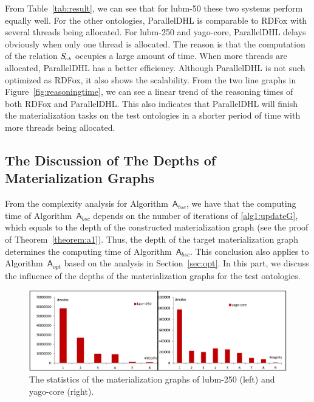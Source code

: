 From Table~\ref{tab:result}, we can see that for lubm-50 these two systems perform equally well.
For the other ontologies, ParallelDHL is comparable to RDFox with several threads being allocated.
For lubm-250 and yago-core, ParallelDHL delays obviously when only one thread is allocated.
The reason is that the computation of the relation $S_{\textit{\!\tiny rch}}$ occupies a large amount of time. When
more threads are allocated, ParallelDHL has a better efficiency.
Although ParallelDHL is not such optimized as RDFox, it also shows the scalability.
From the two line graphs in Figure~\ref{fig:reasoningtime},
we can see a linear trend of the reasoning times of both RDFox and ParallelDHL.
This also indicates that ParallelDHL will finish the materialization tasks on the test ontologies
in a shorter period of time with more threads being allocated.

\subsection{The Discussion of The Depths of Materialization Graphs}

From the complexity analysis for Algorithm~$\mathsf{A}_{bsc}$, we have that the computing time of
Algorithm~$\mathsf{A}_{bsc}$ depends on the number of iterations of \ref{alg1:updateG},
which equals to the depth of the constructed materialization graph (see the proof of Theorem~\ref{theorem:a1}).
Thus, the depth of the target materialization graph determines the computing time of
Algorithm~$\mathsf{A}_{bsc}$. This conclusion also applies to Algorithm~$\mathsf{A}_{opt}$
based on the analysis in Section~\ref{sec:opt}. In this part,
we discuss the influence of the depths of the materialization graphs
for the test ontologies.

\begin{figure}[htbp]
\begin{center}
\includegraphics[width=1\textwidth]{fig-graphdepth.eps}
\caption{The statistics of the materialization graphs of lubm-250 (left) and yago-core (right).}
\label{fig:graphdepth}
\end{center}
\end{figure}

